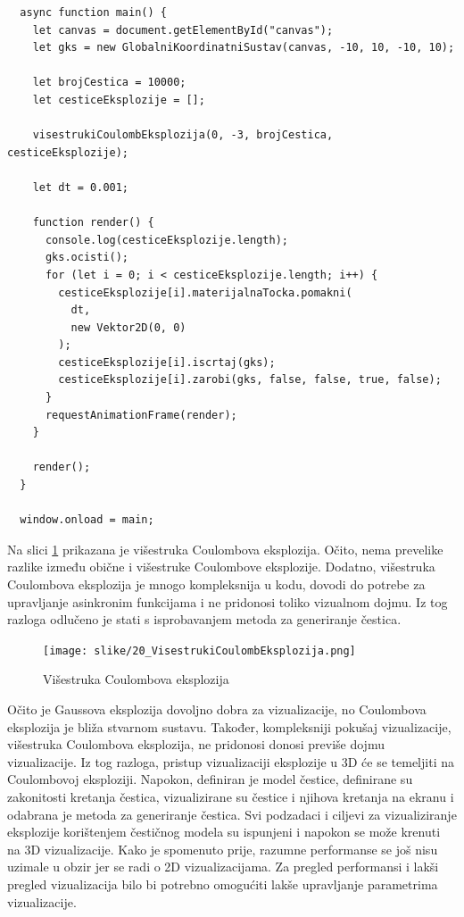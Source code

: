 \documentclass{foi}
\begin{document}
\begin{verbatim}
  async function main() {
    let canvas = document.getElementById("canvas");
    let gks = new GlobalniKoordinatniSustav(canvas, -10, 10, -10, 10);

    let brojCestica = 10000;
    let cesticeEksplozije = [];

    visestrukiCoulombEksplozija(0, -3, brojCestica, cesticeEksplozije);

    let dt = 0.001;

    function render() {
      console.log(cesticeEksplozije.length);
      gks.ocisti();
      for (let i = 0; i < cesticeEksplozije.length; i++) {
        cesticeEksplozije[i].materijalnaTocka.pomakni(
          dt,
          new Vektor2D(0, 0)
        );
        cesticeEksplozije[i].iscrtaj(gks);
        cesticeEksplozije[i].zarobi(gks, false, false, true, false);
      }
      requestAnimationFrame(render);
    }

    render();
  }

  window.onload = main;
\end{verbatim}

Na slici \ref{fig:VisestrukiCoulombEksplozija} prikazana je višestruka Coulombova eksplozija. Očito, nema prevelike razlike između obične i višestruke Coulombove eksplozije. Dodatno, višestruka Coulombova eksplozija je mnogo kompleksnija u kodu, dovodi do potrebe za upravljanje asinkronim funkcijama i ne pridonosi toliko vizualnom dojmu. Iz tog razloga odlučeno je stati s isprobavanjem metoda za generiranje čestica. 

\begin{figure}[H]
    \centering
    \texttt{[image: slike/20\_VisestrukiCoulombEksplozija.png]}
    \captionsetup{justification=centering}
    \caption{Višestruka Coulombova eksplozija}
\label{fig:VisestrukiCoulombEksplozija}
\end{figure}

Očito je Gaussova eksplozija dovoljno dobra za vizualizacije, no Coulombova eksplozija je bliža stvarnom sustavu. Također, kompleksniji pokušaj vizualizacije, višestruka Coulombova eksplozija, ne pridonosi donosi previše dojmu vizualizacije. Iz tog razloga, pristup vizualizaciji eksplozije u 3D će se temeljiti na Coulombovoj eksploziji. Napokon, definiran je model čestice, definirane su zakonitosti kretanja čestica, vizualizirane su čestice i njihova kretanja na ekranu i odabrana je metoda za generiranje čestica. Svi podzadaci i ciljevi za vizualiziranje eksplozije korištenjem čestičnog modela su ispunjeni i napokon se može krenuti na 3D vizualizacije. Kako je spomenuto prije, razumne performanse se još nisu uzimale u obzir jer se radi o 2D vizualizacijama. Za pregled performansi i lakši pregled vizualizacija bilo bi potrebno omogućiti lakše upravljanje parametrima vizualizacije.
\end{document}
